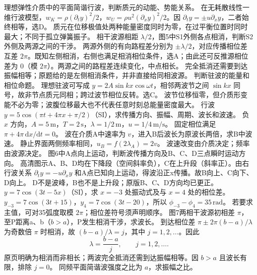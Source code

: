 \problemtext 理想弹性介质中的平面简谐行波，判断质元的动能、势能关系。
\workings 在无耗散线性一维行波模型，$w_K=\rho(\partial_t y)^2/2$，$w_U=\rho u^2(\partial_x y)^2/2$。因 $\partial_t y=\pm u\partial_x y$，二者始终相等，选D。
\crosscheck 质元在位移极值处两种能量密度同时为零，在过平衡位置时同时最大；不同于孤立弹簧振子。
\problemtext 相干波源相距 $\lambda/2$，图5中S1外侧各点相消，判断S2外侧及两源之间的干涉。
\workings 两源外侧的有向路程差分别为 $\pm\lambda/2$，对应传播相位差互差 $2\pi$。既知左侧相消，右侧也满足相消相位条件，选A；由此还可反推源相位差为 $0$（模 $2\pi$）。两源之间的路程差连续变化，中点相长。
\crosscheck 完全抵消还需要到达振幅相等；原题给的是左侧相消条件，并非直接给同相波源。
\problemtext 判断驻波的能量和相位命题。
\workings 理想驻波可写成 $y=2A\sin kx\cos\omega t$，相邻两波节之间 $\sin kx$ 同号，故非节点质元同相；跨过波节相位反转。选C。
\crosscheck 波节位移恒零，但介质形变能不必为零；波腹位移最大也不代表任意时刻总能量密度最大。
\problemtext 行波 $y=5\cos(\pi t+4\pi x+\pi/2)$（SI），求传播方向、振幅、周期、波长和波速。
\workings 负 $x$ 方向，$A=5\,\mathrm m$，$T=2\,\mathrm s$，$\lambda=1/2\,\mathrm m$，$u=1/4\,\mathrm{m/s}$。
\crosscheck 固定相位满足 $\pi+4\pi\,\mathrm dx/\mathrm dt=0$。
\problemtext 波在介质A中速率为 $v$，进入B后波长为原波长两倍，求B中波速。
\workings 静止界面两侧频率相同，$u_B=f(2\lambda_A)=2v$。
\crosscheck 波速改变由介质决定；频率由波源决定。
\problemtext 图6中A点向上运动，判断波传播方向及B、C、D三点瞬时运动方向。
\workings 高清图示A、B、D均在下降段（空间斜率负），C在上升段（斜率正）。由右行波关系 $\partial_t y=-u\partial_x y$ 和A点已知向上运动，得波沿正x传播。故B向上、C向下、D向上。
\crosscheck D不是波峰，B也不是上升段；原版B、C、D方向均已更正。
\problemtext $y=7\cos(3t-5x)$（SI），求 $x=-3$ 处振动式及与 $x=4$ 处的相位差。
\workings $y_{-3}=7\cos(3t+15)$，$y_4=7\cos(3t-20)$，所以 $\phi_{-3}-\phi_4=35\,\mathrm{rad}$。
\crosscheck 若要求主值，可对35弧度取模 $2\pi$；相位差符号须声明顺序。
\problemtext 图7两相干波源初相差 $\pi$，至P距离a、b（$b>a$），P发生相消干涉，求波长。
\workings 到达相位差 $\pi\pm2\pi(b-a)/\lambda$ 为奇数倍 $\pi$ 时相消，故 $(b-a)/\lambda=j$，其中 $j=1,2,\ldots$。因此
\[
\lambda=\frac{b-a}{j},\qquad j=1,2,\ldots .
\]
\crosscheck 原页明确为相消而非相长；两波完全抵消还需到达振幅相等。因 $b>a$ 且波长有限，排除 $j=0$。
\problemtext 同频平面简谐波强度之比为 $a$，求振幅之比。
